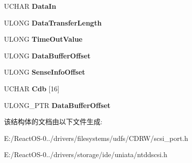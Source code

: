 \begin{DoxyCompactItemize}
\mbox{\label{struct___s_c_s_i___p_a_s_s___t_h_r_o_u_g_h_a71a82ff985fa07ee7dd1848b7026a385}} 
U\+C\+H\+AR {\bfseries Data\+In}
\item 
\mbox{\label{struct___s_c_s_i___p_a_s_s___t_h_r_o_u_g_h_aa04ae7a4a1506379a843615c22d512d7}} 
U\+L\+O\+NG {\bfseries Data\+Transfer\+Length}
\item 
\mbox{\label{struct___s_c_s_i___p_a_s_s___t_h_r_o_u_g_h_ae54751f0d0562b4bdef475e1fab262b1}} 
U\+L\+O\+NG {\bfseries Time\+Out\+Value}
\item 
\mbox{\label{struct___s_c_s_i___p_a_s_s___t_h_r_o_u_g_h_af3581df07b4ab93f45514618ee00ab3e}} 
U\+L\+O\+NG {\bfseries Data\+Buffer\+Offset}
\item 
\mbox{\label{struct___s_c_s_i___p_a_s_s___t_h_r_o_u_g_h_ad264ea3f9fd83a92bd34fbae73d06873}} 
U\+L\+O\+NG {\bfseries Sense\+Info\+Offset}
\item 
\mbox{\label{struct___s_c_s_i___p_a_s_s___t_h_r_o_u_g_h_a913b5c512c17706e9821b5eeebcda25c}} 
U\+C\+H\+AR {\bfseries Cdb} \mbox{[}16\mbox{]}
\item 
\mbox{\label{struct___s_c_s_i___p_a_s_s___t_h_r_o_u_g_h_ac966b8598bc050d8a6ed3ac2f4e11fb1}} 
U\+L\+O\+N\+G\+\_\+\+P\+TR {\bfseries Data\+Buffer\+Offset}
\end{DoxyCompactItemize}


该结构体的文档由以下文件生成\+:\begin{DoxyCompactItemize}
\item 
E\+:/\+React\+O\+S-\/0../drivers/filesystems/udfs/\+C\+D\+R\+W/scsi\+\_\+port.\+h\item 
E\+:/\+React\+O\+S-\/0../drivers/storage/ide/uniata/ntddscsi.\+h\end{DoxyCompactItemize}
